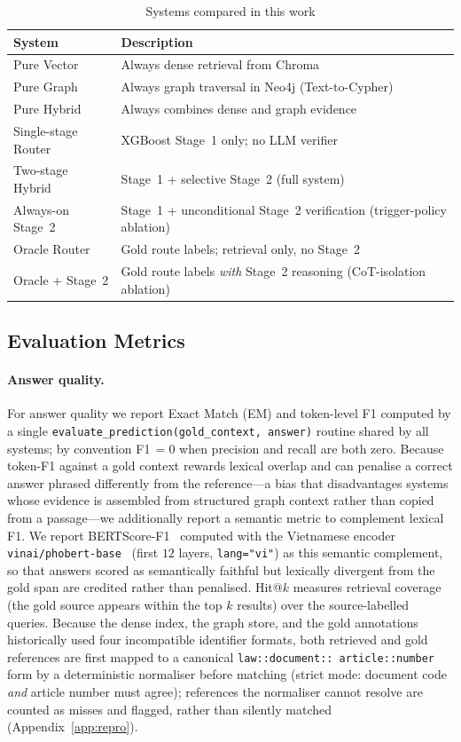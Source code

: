 \documentclass[pdflatex,sn-mathphys-num]{sn-jnl}
\begin{document}
\begin{table}[!htbp]
\centering
\caption{Systems compared in this work}\label{tab:systems}
\begin{tabularx}{\columnwidth}{L{2.7cm}Y}
\toprule
\textbf{System} & \textbf{Description} \\
\midrule
Pure Vector & Always dense retrieval from Chroma \\
Pure Graph & Always graph traversal in Neo4j (Text-to-Cypher) \\
Pure Hybrid & Always combines dense and graph evidence \\
Single-stage Router & XGBoost Stage~1 only; no LLM verifier \\
Two-stage Hybrid & Stage~1 + selective Stage~2 (full system) \\
Always-on Stage~2 & Stage~1 + unconditional Stage~2 verification (trigger-policy ablation) \\
Oracle Router & Gold route labels; retrieval only, no Stage~2 \\
Oracle + Stage~2 & Gold route labels \emph{with} Stage~2 reasoning (CoT-isolation ablation) \\
\bottomrule
\end{tabularx}
\end{table}

\subsection{Evaluation Metrics}\label{subsec:metrics}

\paragraph{Answer quality.}
For answer quality we report Exact Match (EM) and token-level F1 computed by a
single \texttt{evaluate\_prediction(gold\_context, answer)} routine shared by
all systems; by convention F1$\,=0$ when precision and recall are both zero.
Because token-F1 against a gold context rewards lexical overlap and can
penalise a correct answer phrased differently from the reference---a bias that
disadvantages systems whose evidence is assembled from structured graph
context rather than copied from a passage---we additionally report a semantic
metric to complement lexical F1.
We report BERTScore-F1~\cite{zhang2020bertscore} computed with the
Vietnamese encoder \texttt{vinai/phobert-base}~\cite{nguyen2020phobert} (first
$12$ layers, \texttt{lang="vi"}) as this semantic complement, so that answers
scored as semantically faithful but lexically divergent from the gold span
are credited rather than penalised.
Hit@$k$ measures retrieval coverage (the gold source
appears within the top $k$ results) over the source-labelled queries. Because
the dense index, the graph store, and the gold annotations historically used
four incompatible identifier formats, both retrieved and gold references are
first mapped to a canonical \texttt{law::\allowbreak document::\allowbreak
article::\allowbreak number} form by a deterministic normaliser before
matching (strict mode: document code \emph{and} article number must agree);
references the normaliser cannot resolve are counted as misses and flagged,
rather than silently matched (Appendix~\ref{app:repro}).
\end{document}
